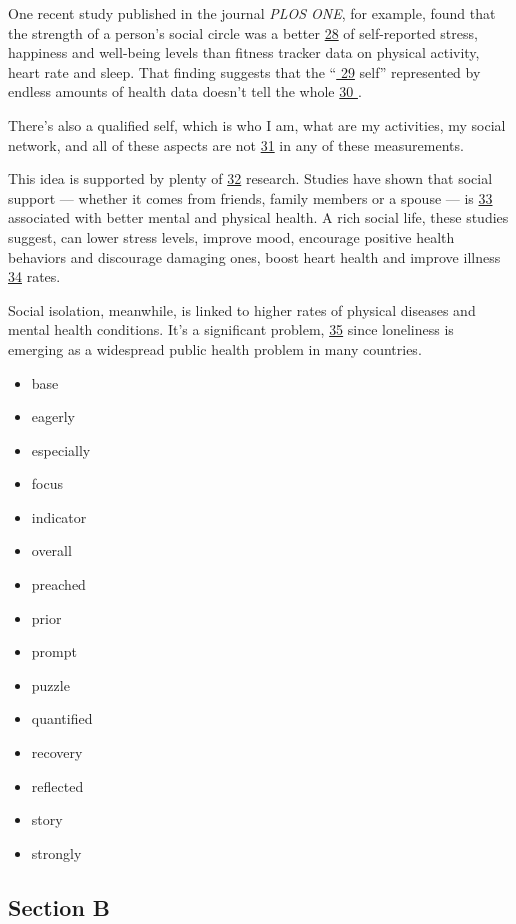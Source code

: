 \documentclass[UTF8,11pt]{ctexart}
\begin{document}
One recent study published in the journal \textit{PLOS ONE}, for example, found that the strength of a person’s social circle was a better \uline{28} of self-reported stress, happiness and well-being levels than fitness tracker data on physical activity, heart rate and sleep. That finding suggests that the “\uline{ 29} self” represented by endless amounts of health data doesn’t tell the whole \uline{30 }.


There’s also a qualified self, which is who I am, what are my activities, my social network, and all of these aspects are not \uline{31} in any of these measurements.


This idea is supported by plenty of \uline{32} research. Studies have shown that social support — whether it comes from friends, family members or a spouse — is \uline{33} associated with better mental and physical health. A rich social life, these studies suggest, can lower stress levels, improve mood, encourage positive health behaviors and discourage damaging ones, boost heart health and improve illness \uline{34} rates.


Social isolation, meanwhile, is linked to higher rates of physical diseases and mental health conditions. It’s a significant problem, \uline{35} since loneliness is emerging as a widespread public health problem in many countries.


\begin{itemize}[leftmargin=2em,itemsep=.2em,topsep=.4em]\item[A.] base
\item[B.] eagerly
\item[C.] especially
\item[D.] focus
\item[E.] indicator
\item[F.] overall
\item[G.] preached
\item[H.] prior
\item[I.] prompt
\item[J.] puzzle
\item[K.] quantified
\item[L.] recovery
\item[M.] reflected
\item[N.] story
\item[O.] strongly
\end{itemize}

\subsection*{\textbf{Section B}}
\end{document}
